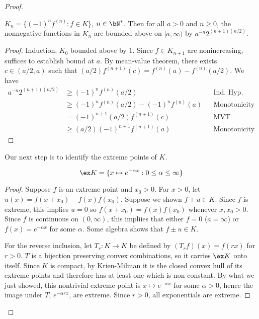 \begin{proof}
  \begin{lemma}
    $K_n = \{(-1)^n f^{(n)} : f \in K\}$, $n \in \bN^*$.
    Then for all $a > 0$ and $n \geq 0$, the
    nonnegative functions in $K_n$ are bounded above
    on $[a, \infty)$ by $a^{-n} 2^{(n+1)(n/2)}$.
  \end{lemma}
  \begin{proof}
    Induction, $K_0$ bounded above by $1$.
    Since $f \in K_{n+1}$ are nonincreasing, suffices to establish bound at
    $a$.  By mean-value theorem, there exists $c \in (a/2,a)$ such that
    $(a/2) f^{(n+1)}(c) = f^{(n)}(a) - f^{(n)}(a/2)$. We have
    \begin{align*}
      a^{-n} 2^{(n+1)(n/2)}
      &\geq (-1)^n f^{(n)}(a/2)  &&\text{Ind. Hyp.}\\
      &\geq (-1)^n f^{(n)} (a/2) - (-1)^n f^{(n)}(a) &&\text{Monotonicity}\\
      &= (-1)^{n+1} (a/2) f^{(n+1)}(c) &&\text{MVT} \\
      &\geq (a/2) (-1)^{n+1} f^{(n+1)}(a) &&\text{Monotonicity}
    \end{align*}
  \end{proof}

  Our next step is to identify the extreme points of $K$.
  \begin{lemma}
    \[
      \ex K = \{ x \mapsto e^{-\alpha x} : 0 \leq \alpha \leq \infty \}
    \]
  \end{lemma}

  \begin{proof}
    Suppose $f$ is an extreme point
    and $x_0 > 0$. For $x > 0$, let $u(x) = f(x + x_0) - f(x) f(x_0)$.
    Suppose we shown $f \pm u \in K$. Since $f$ is extreme, this
    implies $u = 0$ so $f(x + x_0) = f(x) f(x_0)$ whenever $x, x_0 > 0$.
    Since $f$ is continuous on $(0, \infty)$, this impliies that either $f = 0$
    ($a = \infty$) or $f(x) = e^{-\alpha x}$ for some $\alpha$.
    Some algebra \todo{} shows that $f \pm u \in K$.

    For the reverse inclusion, let $T_r : K \to K$ be defined by
    $(T_r f)(x) = f(r x)$ for $r > 0$. $T$ is a bijection preserving
    convex combinations, so it carries $\ex K$ onto itself.
    Since $K$ is compact, by Krien-Milman
    it is the closed convex hull of its extreme points and therefore has at least
    one which is non-constant. By what we just showed, this nontrivial
    extreme point is $x \mapsto e^{-\alpha x}$ for some $\alpha > 0$, hence the
    image under $T$, $e^{-\alpha r x}$, are extreme. Since $r > 0$,
    all exponentials are extreme.
  \end{proof}


\end{proof}
